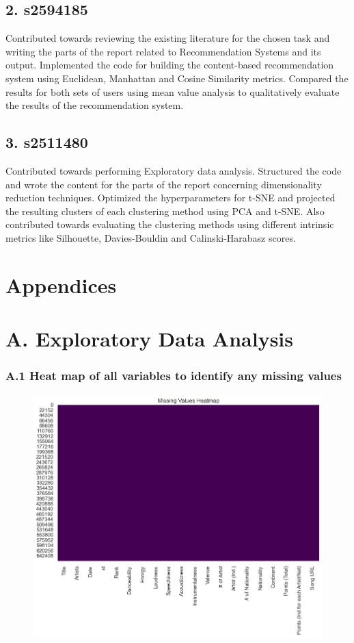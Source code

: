\documentclass{article}
\begin{document}
\subsection*{2. s2594185}
Contributed towards reviewing the existing literature for the chosen task and writing the parts of the report related to Recommendation Systems and its output. Implemented the code for building the content-based recommendation system using Euclidean, Manhattan and Cosine Similarity metrics. Compared the results for both sets of users using mean value analysis to qualitatively evaluate the results of the recommendation system.
\subsection*{3. s2511480}
Contributed towards performing Exploratory data analysis. Structured the code and wrote the content for the parts of the report concerning dimensionality reduction techniques. Optimized the hyperparameters for t-SNE and projected the resulting clusters of each clustering method using PCA and t-SNE. Also contributed towards evaluating the clustering methods using different intrinsic metrics like Silhouette, Davies-Bouldin and Calinski-Harabasz scores.


\clearpage


\section*{Appendices}
\section*{A. Exploratory Data Analysis}
\subsubsection*{A.1 Heat map of all variables to identify any missing values }
\label{app:heat-map}
\begin{figure}[H]
    \centering
    \includegraphics[width=0.5\linewidth]{Images/Data Heat Map.png}
\end{figure}
\end{document}
